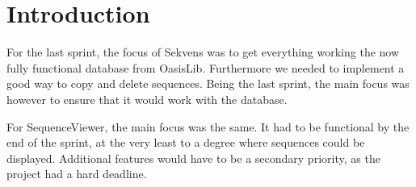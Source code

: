 \section{Introduction}
For the last sprint, the focus of Sekvens was to get everything working the now fully functional database from OasisLib. Furthermore we needed to implement a good way to copy and delete sequences. Being the last sprint, the main focus was however to ensure that it would work with the database.

For SequenceViewer, the main focus was the same. It had to be functional by the end of the sprint, at the very least to a degree where sequences could be displayed. Additional features would have to be a secondary priority, as the project had a hard deadline.